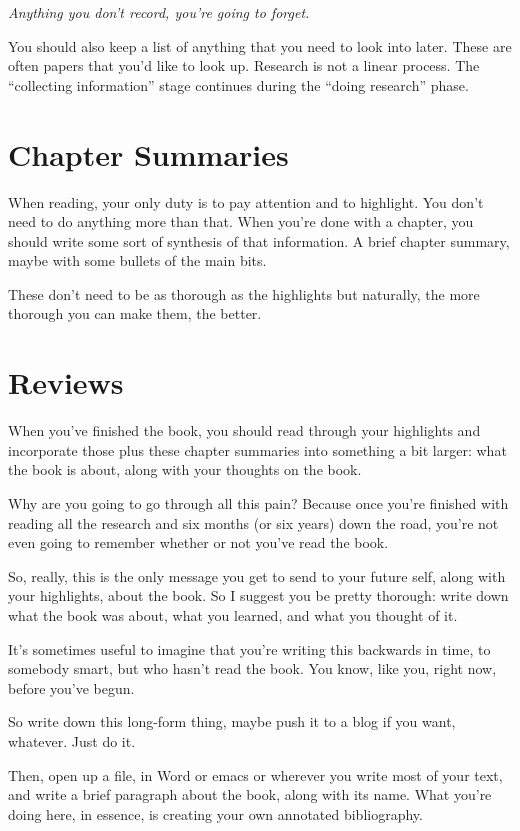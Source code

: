 \textit{Anything you don't record, you're going to forget.}

You should also keep a list of anything that you need to look into later. These are
often papers that you'd like to look up. Research is not a linear process. The
``collecting information'' stage continues during the ``doing research'' phase.

\section{Chapter Summaries}

When reading, your only duty is to pay attention and to highlight. You don't
need to do anything more than that. When you're done with a chapter, you should
write some sort of synthesis of that information. A brief chapter summary, maybe
with some bullets of the main bits.

These don't need to be as thorough as the highlights but naturally, the more
thorough you can make them, the better.

\section{Reviews}

When you've finished the book, you should read through your highlights
and incorporate those plus these chapter
summaries into something a bit larger: what the book is about, along with your
thoughts on the book.

Why are you going to go through all this pain? Because once you're finished
with reading all the research and six months (or six years) down the road,
you're not even going to remember whether or not you've read the book.

So, really, this is the only message you get to send to your future self, along
with your highlights, about the book. So I suggest you be pretty
thorough: write down what the book was about, what you learned, and what you
thought of it.

It's sometimes useful to imagine that you're writing this backwards in time, to
somebody smart, but who hasn't read the book. You know, like you, right now,
before you've begun.

So write down this long-form thing, maybe push it to a blog if you want,
whatever. Just do it.

Then, open up a file, in Word or emacs or wherever you write most of your text,
and write a brief paragraph about the book, along with its name. What you're
doing here, in essence, is creating your own annotated bibliography.

